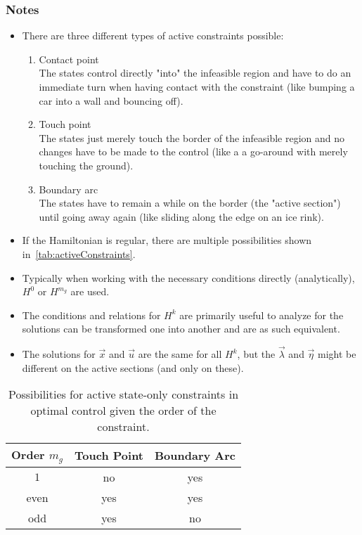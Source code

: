 			\subsubsection{Notes}
				\begin{itemize}
					\item There are three different types of active constraints possible:
						\begin{enumerate}
							\item Contact point \\ The states control directly "into" the infeasible region and have to do an immediate turn when having contact with the constraint (like bumping a car into a wall and bouncing off).
							\item Touch point \\ The states just merely touch the border of the infeasible region and no changes have to be made to the control (like a a go-around with merely touching the ground).
							\item Boundary arc \\ The states have to remain a while on the border (the "active section") until going away again (like sliding along the edge on an ice rink).
						\end{enumerate}
					\item If the Hamiltonian is regular, there are multiple possibilities shown in~\autoref{tab:activeConstraints}.
					\item Typically when working with the necessary conditions directly (analytically), \(H^0\) or \(H^{m_g}\) are used.
					\item The conditions and relations for \(H^k\) are primarily useful to analyze for the solutions can be transformed one into another and are as such equivalent.
					\item The solutions for \(\vec{x}\) and \(\vec{u}\) are the same for all \(H^k\), but the \(\vec{\lambda}\) and \(\vec{\eta}\) might be different on the active sections (and only on these).
				\end{itemize}

				\begin{table}
					\centering
					\begin{tabular}{c|cc}
						Order \(m_g\) & Touch Point & Boundary Arc \\ \hline
						\(1\)         & no          & yes          \\
						even          & yes         & yes          \\
						odd           & yes         & no
					\end{tabular}
					\caption{Possibilities for active state-only constraints in optimal control given the order of the constraint.}
					\label{tab:activeConstraints}
				\end{table}

